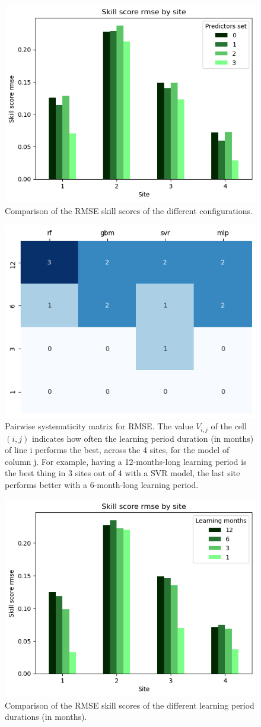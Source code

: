 \begin{figure}[htb!]
    \centering
    \includegraphics[width=0.72\columnwidth]{figures/first_study/comp_predictors_rmse_mlp.png}
\caption{Comparison of the RMSE skill scores of the different configurations.}
\end{figure}

\begin{figure}[htb!]
    \centering
    \includegraphics[width=0.6\columnwidth]{figures/first_study/comp_learning_period_rmse.png}
\caption{Pairwise systematicity matrix for RMSE. The value $V_{i,j}$ of the cell $(i,j)$ indicates how often the learning period duration (in months) of line i performs the best, across the 4 sites, for the model of column j. For example, having a 12-months-long learning period is the best thing in 3 sites out of 4 with a SVR model, the last site performs better with a 6-month-long learning period.}
\end{figure}

\begin{figure}[htb!]
    \centering
    \includegraphics[width=0.6\columnwidth]{figures/first_study/comp_learning_period_rmse_mlp.png}
\caption{Comparison of the RMSE skill scores of the different learning period durations (in months).}
\end{figure}


